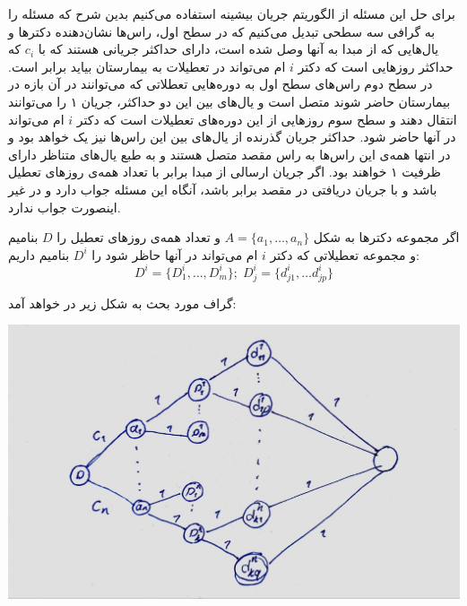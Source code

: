 \documentclass[]{article}
\begin{document}
برای حل این مسئله از الگوریتم جریان بیشینه استفاده می‌کنیم بدین شرح که 
مسئله را به گرافی سه سطحی تبدیل می‌کنیم که در  سطح اول، راس‌ها نشان‌دهنده دکترها و
یال‌هایی که از مبدا به آنها وصل شده است، دارای حداکثر جریانی هستند که با $c_i$
که حداکثر روزهایی است که دکتر $i$ ام می‌تواند در تعطیلات به بیمارستان بیاید برابر است.
در سطح دوم راس‌های سطح اول به دوره‌هایی تعطلاتی که می‌توانند در آن بازه در بیمارستان حاضر شوند
متصل است و یال‌های بین این دو حداکثر، جریان ۱ را می‌توانند انتقال دهند و
سطح سوم روزهایی از این دوره‌های تعطیلات است که دکتر $i$ ام می‌تواند در آنها حاضر شود.
حداکثر جریان گذرنده از یال‌های بین این راس‌ها نیز یک خواهد بود
و در انتها همه‌ی این راس‌ها به راس مقصد متصل هستند و به طبع یال‌های متناظر دارای ظرفیت ۱ خواهند بود.
اگر جریان ارسالی از مبدا برابر با تعداد همه‌ی روز‌‌های تعطیل باشد و با جریان دریافتی 
در مقصد برابر باشد، آنگاه این مسئله جواب دارد و در غیر اینصورت جواب ندارد.

اگر مجموعه دکترها به شکل $A = \lbrace a_1, \dots, a_n \rbrace$ و 
تعداد همه‌ی روزهای تعطیل را $D$ بنامیم و
مجموعه تعطیلاتی که دکتر $i$ ام می‌تواند در آنها حاظر شود را $D^i$ بنامیم داریم:
$$D^i = \lbrace D_1^i, \dots, D_m^i \rbrace; \; D_j^i = \lbrace d_{j1}^i, \dots d_{jp}^i \rbrace$$

\pagebreak
گراف مورد بحث به شکل زیر در خواهد آمد:

\vspace{0.3cm}
\includegraphics*[scale=0.35]{graph.jpg}
\end{document}
